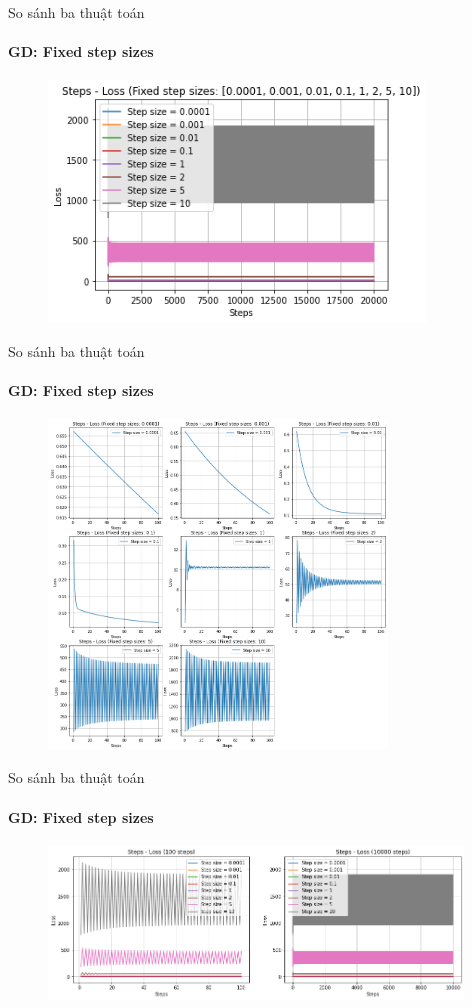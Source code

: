 \documentclass[10pt]{beamer}
\theoremstyle{remark}
\theoremstyle{definition}
\begin{document}
\begin{frame}{So sánh ba thuật toán}
	\framesubtitle{GD: Fixed step sizes}
	\begin{figure}[h!]
		\centering
		\includegraphics[width=10cm]{Thinh/1.png}
	  \end{figure}

\end{frame}
\begin{frame}{So sánh ba thuật toán}
	\framesubtitle{GD: Fixed step sizes}

	  \begin{figure}[h!]
		\centering
		\includegraphics[width=9cm]{Thinh/2.png}
	  \end{figure}

\end{frame}
\begin{frame}{So sánh ba thuật toán}
	\framesubtitle{GD: Fixed step sizes}

	  \begin{figure}[h!]
		\centering
		\includegraphics[width=11cm]{Thinh/3.png}
	  \end{figure}

\end{frame}
\end{document}
